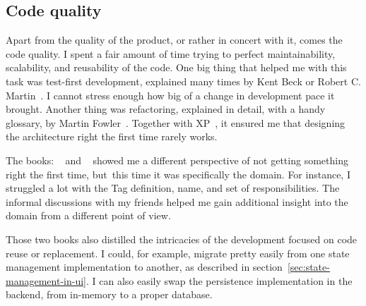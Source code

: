 \subsection{Code quality}\label{sec:code-quality}

Apart from the quality of the product,
or rather in concert with it,
comes the code quality.
I spent a fair amount of time trying
to perfect maintainability,
scalability,
and reusability of the code.
One big thing that helped me with this task
was test-first development,
explained many times by Kent Beck or
Robert C. Martin~\cite{beck_extreme_2004,beck_test-driven_2002,martin_clean_2011}.
I cannot stress enough how big
of a change in development pace it brought.
Another thing was refactoring,
explained in detail,
with a handy glossary,
by Martin Fowler~\cite{fowler_refactoring_2019}.
Together with \ac{XP}~\cite{beck_extreme_2004},
it ensured me that designing the architecture right
the first time rarely works.

The books:
~\cite{millett_patterns_2015}
and ~\cite{evans_domain-driven_2003}
showed me a different perspective
of not getting something right the first time,
but~this time it was specifically the domain.
For instance,
I struggled a lot with the Tag definition,
name, and set of responsibilities.
The informal discussions with my friends
helped me gain additional insight into the domain
from a different point of view.

Those two books also distilled the intricacies
of the development focused on code reuse or replacement.
I could, for example,
migrate pretty easily
from one state management implementation to another,
as described in section~\ref{sec:state-management-in-ui}.
I can also easily swap
the persistence implementation in the backend,
from in-memory to a proper database.
